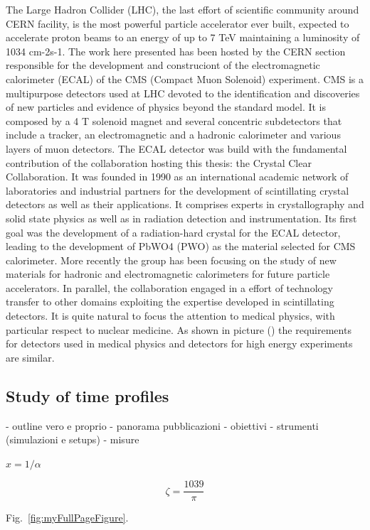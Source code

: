 The Large Hadron Collider (LHC), the last effort of scientific community around CERN facility, is the most powerful particle accelerator ever built, expected to accelerate proton beams to an energy of up to 7 TeV maintaining a luminosity of 1034 cm-2s-1. 
The work here presented has been hosted by the CERN section responsible for the development and construciont of the electromagnetic calorimeter (ECAL) of the CMS (Compact Muon Solenoid) experiment.
CMS is a multipurpose detectors used at LHC devoted to the identification and discoveries of new particles and evidence of physics beyond the standard model. It is composed by a 4 T solenoid magnet and several concentric subdetectors that include a tracker, an electromagnetic and a hadronic calorimeter and various layers of muon detectors. 
The ECAL detector was build with the fundamental contribution of the collaboration hosting this thesis: the Crystal Clear Collaboration. It was founded in 1990 as an international academic network of laboratories and industrial partners for the development of scintillating crystal detectors as well as their applications. It comprises experts in crystallography and solid state physics as well as in radiation detection and instrumentation. 
Its first goal was the development of a radiation-hard crystal for the ECAL detector, leading to the development of PbWO4 (PWO) as the material selected for CMS calorimeter. More recently the group has been focusing on the study of new materials for hadronic and electromagnetic calorimeters for future particle accelerators.
In parallel, the collaboration engaged in a effort of technology transfer to other domains exploiting the expertise developed in scintillating detectors. It is quite natural to focus the attention to medical physics, with particular respect to nuclear medicine. As shown in picture () the requirements for detectors used in medical physics and detectors for high energy experiments are similar.

\subsection{Study of time profiles}
- outline vero e proprio
	- panorama pubblicazioni
	- obiettivi
	- strumenti (simulazioni e setups)
	- misure

$x = 1/\alpha$ 

$$\zeta = \frac{1039}{\pi}$$

Fig.~\ref{fig:myFullPageFigure}.


\afterpage{\clearpage}


